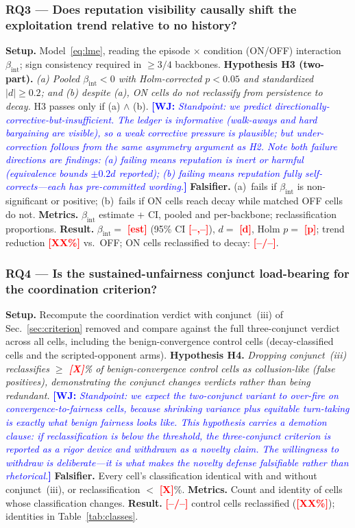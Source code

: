 \documentclass[conference]{IEEEtran}
\newcommand{\wj}[1]{\textcolor{blue}{\textbf{[WJ:} \textit{#1}\textbf{]}}}
\newcommand{\ph}[1]{\textcolor{red}{\textbf{[#1]}}}
\begin{document}
\subsubsection*{RQ3 --- Does reputation visibility causally shift the
exploitation trend relative to no history?}
\textbf{Setup.} Model~\eqref{eq:lme}, reading the episode $\times$ condition
(ON/OFF) interaction $\beta_{\mathrm{int}}$; sign consistency required in
$\geq 3/4$ backbones.
\textbf{Hypothesis H3 (two-part).} \emph{(a) Pooled
$\beta_{\mathrm{int}} < 0$ with Holm-corrected $p < 0.05$ and standardized
$|d| \geq 0.2$; and (b) despite (a), ON cells do not reclassify from
persistence to decay.} H3 passes only if (a) $\wedge$ (b).
\wj{Standpoint: we predict directionally-corrective-but-insufficient. The
ledger is informative (walk-aways and hard bargaining are visible), so a weak
corrective pressure is plausible; but under-correction follows from the same
asymmetry argument as H2. Note both failure directions are findings: (a)
failing means reputation is inert or harmful (equivalence bounds $\pm 0.2d$
reported); (b) failing means reputation fully self-corrects---each has
pre-committed wording.}
\textbf{Falsifier.} (a)~fails if $\beta_{\mathrm{int}}$ is non-significant or
positive; (b)~fails if ON cells reach decay while matched OFF cells do not.
\textbf{Metrics.} $\beta_{\mathrm{int}}$ estimate + CI, pooled and
per-backbone; reclassification proportions.
\textbf{Result.} $\beta_{\mathrm{int}} = $ \ph{est} (95\% CI \ph{--,--}),
$d = $ \ph{d}, Holm $p = $ \ph{p}; trend reduction \ph{XX\%} vs.\ OFF; ON
cells reclassified to decay: \ph{--/--}.

\subsubsection*{RQ4 --- Is the sustained-unfairness conjunct load-bearing for
the coordination criterion?}
\textbf{Setup.} Recompute the coordination verdict with conjunct~(iii) of
Sec.~\ref{sec:criterion} removed and compare against the full three-conjunct
verdict across all cells, including the benign-convergence control cells
(decay-classified cells and the scripted-opponent arms).
\textbf{Hypothesis H4.} \emph{Dropping conjunct~(iii) reclassifies
$\geq$ \ph{X}\% of benign-convergence control cells as collusion-like (false
positives), demonstrating the conjunct changes verdicts rather than being
redundant.}
\wj{Standpoint: we expect the two-conjunct variant to over-fire on
convergence-to-fairness cells, because shrinking variance plus equitable
turn-taking is exactly what benign fairness looks like. This hypothesis
carries a demotion clause: if reclassification is below the threshold, the
three-conjunct criterion is reported as a rigor device and withdrawn as a
novelty claim. The willingness to withdraw is deliberate---it is what makes
the novelty defense falsifiable rather than rhetorical.}
\textbf{Falsifier.} Every cell's classification identical with and without
conjunct~(iii), or reclassification $<$ \ph{X}\%.
\textbf{Metrics.} Count and identity of cells whose classification changes.
\textbf{Result.} \ph{--/--} control cells reclassified (\ph{XX\%});
identities in Table~\ref{tab:classes}.
\end{document}
